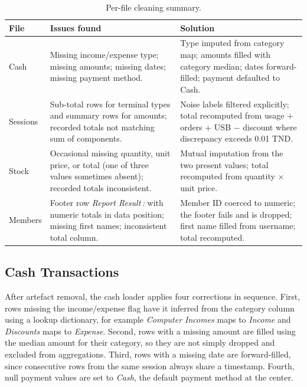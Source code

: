 \documentclass[12pt, a4paper]{report}
\begin{document}
\begin{table}[H]
  \centering
  \caption{Per-file cleaning summary.\label{tab:file_issues}}
  \begin{tabular}{p{2.5cm} p{4cm} p{6cm}}
    \toprule
    \textbf{File} & \textbf{Issues found} & \textbf{Solution} \\
    \midrule
    Cash
      & Missing income/expense type; missing amounts; missing dates;
        missing payment method.
      & Type imputed from category map; amounts filled with category
        median; dates forward-filled; payment defaulted to Cash. \\[4pt]
    Sessions
      & Sub-total rows for terminal types and summary rows for amounts;
        recorded totals not matching sum of components.
      & Noise labels filtered explicitly; total recomputed from
        usage + orders + USB $-$ discount where discrepancy exceeds 0.01 TND. \\[4pt]
    Stock
      & Occasional missing quantity, unit price, or total (one of three
        values sometimes absent); recorded totals inconsistent.
      & Mutual imputation from the two present values; total recomputed
        from quantity $\times$ unit price. \\[4pt]
    Members
      & Footer row \textit{Report Result\,:} with numeric totals in data
        position; missing first names; inconsistent total column.
      & Member ID coerced to numeric; the footer fails and is dropped; first
        name filled from username; total recomputed. \\
    \bottomrule
  \end{tabular}
\end{table}

\subsection{Cash Transactions}

After artefact removal, the cash loader applies four corrections in sequence. First,
rows missing the income/expense flag have it inferred from the category column using
a lookup dictionary, for example \textit{Computer Incomes} maps to \textit{Income}
and \textit{Discounts} maps to \textit{Expense}. Second, rows with a missing amount
are filled using the median amount for their category, so they are not simply dropped
and excluded from aggregations. Third, rows with a missing date are forward-filled,
since consecutive rows from the same session always share a timestamp. Fourth, null
payment values are set to \textit{Cash}, the default payment method at the center.
\end{document}
